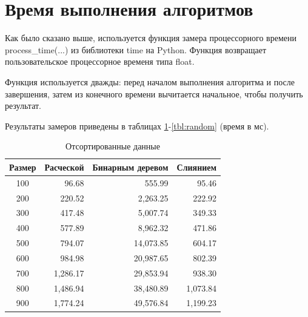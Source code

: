 \section{Время выполнения алгоритмов}

Как было сказано выше, используется функция замера процессорного времени process\_time(...) из библиотеки time на Python. Функция возвращает пользовательское процессорное временя типа float.

Функция используется дважды: перед началом выполнения алгоритма и после завершения, затем из конечного времени вычитается начальное, чтобы получить результат.

Результаты замеров приведены в таблицах \ref{tbl:best}-\ref{tbl:random} (время в мс).

\begin{table}[h]
	\begin{center}
		\begin{threeparttable}
		\captionsetup{singlelinecheck=off, justification=raggedright}
		\caption{Отсортированные данные}
		\label{tbl:best}
		\begin{tabular}{|c|r|r|r|}
			\hline
			Размер & Расческой & Бинарным деревом & Слиянием \\
			\hline
			  100 & 96.68 & 555.99 & 95.46 \\ 
			\hline
			200 & 220.52 & \multicolumn{1}{|r|}{2,263.25} & 222.92 \\ 
			\hline
			300 & 417.48 & \multicolumn{1}{|r|}{5,007.74} & 349.33 \\ 
			\hline
			400 & 577.89 & \multicolumn{1}{|r|}{8,962.32} & 471.86 \\ 
			\hline
			500 & 794.07 & \multicolumn{1}{|r|}{14,073.85} & 604.17 \\ 
			\hline
			600 & 984.98 & \multicolumn{1}{|r|}{20,987.65} & 802.39 \\ 
			\hline
			700 & \multicolumn{1}{|r|}{1,286.17} & \multicolumn{1}{|r|}{29,853.94} & 938.30 \\ 
			\hline
			800 & \multicolumn{1}{|r|}{1,486.94} & \multicolumn{1}{|r|}{38,480.89} & \multicolumn{1}{|r|}{1,073.84} \\ 
			\hline
			900 & \multicolumn{1}{|r|}{1,774.24} & \multicolumn{1}{|r|}{49,576.84} & \multicolumn{1}{|r|}{1,199.23} \\ 
			\hline
		\end{tabular}
		\end{threeparttable}
    \end{center}
\end{table}

